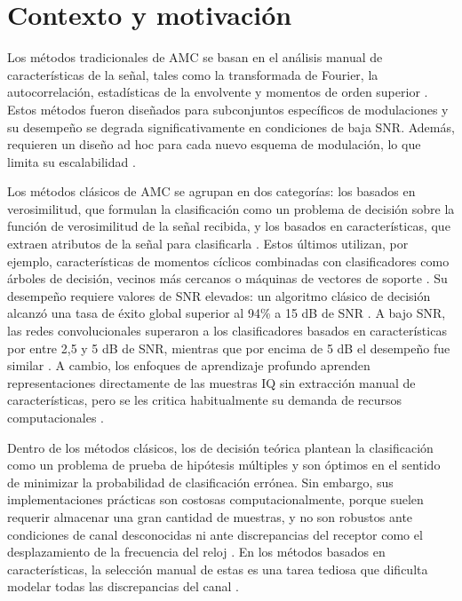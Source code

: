 
\section{Contexto y motivación}

Los métodos tradicionales de AMC se basan en el análisis manual de características de la señal, tales como la transformada de Fourier, la autocorrelación, estadísticas de la envolvente y momentos de orden superior \cite{zhu2015automatic}. Estos métodos fueron diseñados para subconjuntos específicos de modulaciones y su desempeño se degrada significativamente en condiciones de baja SNR. Además, requieren un diseño ad hoc para cada nuevo esquema de modulación, lo que limita su escalabilidad \cite{dobre2007survey}.

Los métodos clásicos de AMC se agrupan en dos categorías: los basados en verosimilitud, que formulan la clasificación como un problema de decisión sobre la función de verosimilitud de la señal recibida, y los basados en características, que extraen atributos de la señal para clasificarla \cite{dobre2007survey}. Estos últimos utilizan, por ejemplo, características de momentos cíclicos combinadas con clasificadores como árboles de decisión, vecinos más cercanos o máquinas de vectores de soporte \cite{oshea2016convolutional}. Su desempeño requiere valores de SNR elevados: un algoritmo clásico de decisión alcanzó una tasa de éxito global superior al 94\% a 15 dB de SNR \cite{nandi1998algorithms}. A bajo SNR, las redes convolucionales superaron a los clasificadores basados en características por entre 2,5 y 5 dB de SNR, mientras que por encima de 5 dB el desempeño fue similar \cite{oshea2016convolutional}. A cambio, los enfoques de aprendizaje profundo aprenden representaciones directamente de las muestras IQ sin extracción manual de características, pero se les critica habitualmente su demanda de recursos computacionales \cite{oshea2016convolutional}.

Dentro de los métodos clásicos, los de decisión teórica plantean la clasificación como un problema de prueba de hipótesis múltiples y son óptimos en el sentido de minimizar la probabilidad de clasificación errónea. Sin embargo, sus implementaciones prácticas son costosas computacionalmente, porque suelen requerir almacenar una gran cantidad de muestras, y no son robustos ante condiciones de canal desconocidas ni ante discrepancias del receptor como el desplazamiento de la frecuencia del reloj \cite{rajendran2018distributed}. En los métodos basados en características, la selección manual de estas es una tarea tediosa que dificulta modelar todas las discrepancias del canal \cite{rajendran2018distributed}.

